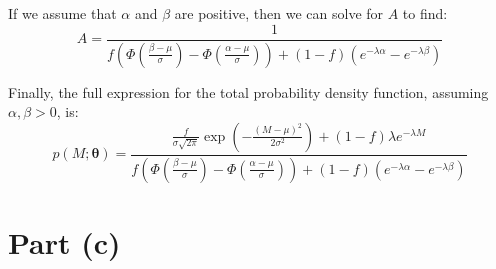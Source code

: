\documentclass{article}
\begin{document}
If we assume that $\alpha$ and $\beta$ are positive, then we can solve for $A$ to find:
\[
A = \frac{1}{
f \left( \Phi(\frac{\beta-\mu}{\sigma}) - \Phi(\frac{\alpha-\mu}{\sigma}) \right) +
(1-f)( e^{-\lambda\alpha} - e^{-\lambda\beta} )
}
\]

Finally, the full expression for the total probability density function, assuming $\alpha, \beta > 0$, is:
\[
p(M; \boldsymbol{\theta}) = 
\frac{
\frac{f}{\sigma\sqrt{2\pi}} \exp\left(-\frac{(M - \mu)^2}{2\sigma^2}\right) + (1-f)\lambda e^{-\lambda M}
}
{
f \left( \Phi(\frac{\beta-\mu}{\sigma}) - \Phi(\frac{\alpha-\mu}{\sigma}) \right) +
(1-f)( e^{-\lambda\alpha} - e^{-\lambda\beta} )
}
\]

\section*{Part (c)}
\end{document}
